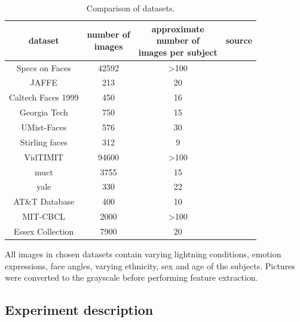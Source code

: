 \documentclass[a4paper, 10 pt, journal]{ieeeconf}
\begin{document}
\begin{table}[!h]
    \centering
    \caption{Comparison of datasets.}
    \begin{tabular}{|c|c|c|c|}
         \hline
         dataset & \thead{number of\\ images} & \thead{approximate\\ number of\\ images per subject} & source \\
         \hline
         Specs on Faces & 42592 & >100 & \cite{afifi2017afif4} \\
         \hline
         JAFFE & 213 & 20 & \cite{JAFFE} \\
         \hline
         Caltech Faces 1999 & 450 & 16 & \cite{CaltechFaces} \\
         \hline
         Georgia Tech & 750 & 15 & \cite{georgia_tech_face_database} \\
         \hline
         UMist-Faces & 576 & 30 & \cite{UMist-Faces} \\
         \hline
         Stirling faces & 312 & 9 & \cite{Stirling_faces} \\
         \hline
         VidTIMIT & 94600 & >100 & \cite{VidTIMIT} \\
         \hline
         muct & 3755 & 15 & \cite{Milborrow10} \\
         \hline
         yale & 330 & 22 & \cite{yale} \\
         \hline
         AT\&T Database & 400 & 10 & \cite{TheDatabaseOfFaces} \\
         \hline
         MIT-CBCL  & 2000 & >100 & \cite{FaceRecognitionDatabase} \\
         \hline
         Essex Collection & 7900 & 20 & \cite{essex} \\
          \hline
    \end{tabular}
    \label{tab:datasets}
\end{table}



All images in chosen datasets contain varying lightning conditions, emotion expressions, face angles, varying ethnicity, sex and age of the subjects. Pictures were converted to the grayscale before performing feature extraction. 

\newpage

\subsection{Experiment description}
\end{document}
